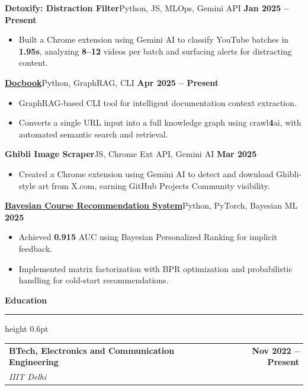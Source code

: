 \documentclass[10pt,letterpaper]{article}
\makeatletter
\newcommand{\sectiontitle}[1]{%
  \vspace{3pt}
  {\normalsize\bfseries\color{accent} #1}\par
  \vspace{1pt}
  {\color{accent}\hrule height 0.6pt}
  \vspace{2pt}
}
\newcommand{\entry}[4]{%
  \begin{tabularx}{\textwidth}{@{}X r@{}}
    {\bfseries #1} & {\footnotesize\bfseries #2} \\
    {\footnotesize\textit{#3}} & {\footnotesize #4}
  \end{tabularx}
  \vspace{1pt}
}
\newcommand{\projectentry}[2]{%
  {\bfseries #1}\hfill{\footnotesize #2}\par
  \vspace{1pt}
}
\newenvironment{tightitems}{%
  \begin{itemize}
    \setlength{\itemsep}{0pt}
    \setlength{\parskip}{0pt}
    \setlength{\parsep}{0pt}
    \setlength{\topsep}{1pt}
    \setlength{\leftmargin}{12pt}
}{%
  \end{itemize}
  \vspace{0pt}
}
\makeatother
\begin{document}
\projectentry{Detoxify: Distraction Filter}{Python, JS, MLOps, Gemini API \textbar{} \textbf{Jan 2025 -- Present}}
\begin{tightitems}
  \item Built a Chrome extension using Gemini AI to classify YouTube batches in \textbf{1.95s}, analyzing \textbf{8--12} videos per batch and surfacing alerts for distracting content.
\end{tightitems}

\projectentry{\href{https://github.com/Saarthakkj/docbook}{Docbook}}{Python, GraphRAG, CLI \textbar{} \textbf{Apr 2025 -- Present}}
\begin{tightitems}
  \item GraphRAG-based CLI tool for intelligent documentation context extraction.
  \item Converts a single URL input into a full knowledge graph using crawl\textbf{4}ai, with automated semantic search and retrieval.
\end{tightitems}

\projectentry{Ghibli Image Scraper}{JS, Chrome Ext API, Gemini AI \textbar{} \textbf{Mar 2025}}
\begin{tightitems}
  \item Created a Chrome extension using Gemini AI to detect and download Ghibli-style art from X.com, earning GitHub Projects Community visibility.
\end{tightitems}

\projectentry{\href{https://github.com/Saarthakkj/course_reccomendation}{Bayesian Course Recommendation System}}{Python, PyTorch, Bayesian ML \textbar{} \textbf{2025}}
\begin{tightitems}
  \item Achieved \textbf{0.915} AUC using Bayesian Personalized Ranking for implicit feedback.
  \item Implemented matrix factorization with BPR optimization and probabilistic handling for cold-start recommendations.
\end{tightitems}

\sectiontitle{Education}

\entry{BTech, Electronics and Communication Engineering}{\textbf{Nov 2022 -- Present}}{IIIT Delhi}{}
\end{document}
